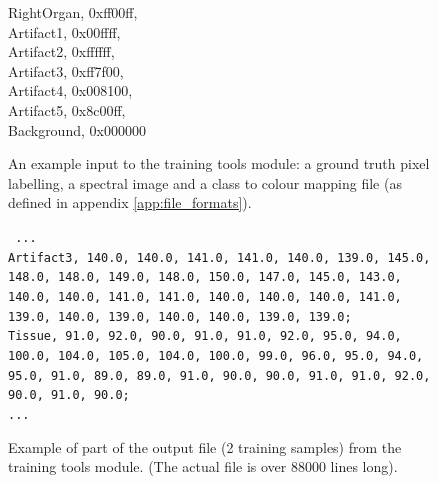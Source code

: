 \documentclass[12pt,twoside,notitlepage]{report}
\begin{document}
\begin{figure}
\begin{framed}
{                    RightOrgan, 0xff00ff,   \\
                    Artifact1, 0x00ffff,    \\
                    Artifact2, 0xffffff,    \\
                    Artifact3, 0xff7f00,    \\
                    Artifact4, 0x008100,    \\
                    Artifact5, 0x8c00ff,    \\
                    Background, 0x000000    \\
                } 
            \end{framed}
            \caption[An example input to the training tools module.]{An example input to the training tools module: a ground truth pixel labelling, a spectral image 
            and a class to colour mapping file (as defined in appendix \ref{app:file_formats}).}
        \end{figure}

        \begin{figure}
            \begin{framed}
                {\tt
                  ... \\
                  Artifact3, 140.0, 140.0, 141.0, 141.0, 140.0, 139.0, 145.0, 148.0, 148.0, 149.0, 148.0, 150.0, 147.0, 145.0, 143.0, 140.0, 140.0, 141.0, 141.0, 140.0, 140.0, 140.0, 141.0, 139.0, 140.0, 139.0, 140.0, 140.0, 139.0, 139.0; \\
                  Tissue, 91.0, 92.0, 90.0, 91.0, 91.0, 92.0, 95.0, 94.0, 100.0, 104.0, 105.0, 104.0, 100.0, 99.0, 96.0, 95.0, 94.0, 95.0, 91.0, 89.0, 89.0, 91.0, 90.0, 90.0, 91.0, 91.0, 92.0, 90.0, 91.0, 90.0; \\
                  ... 
                } 
            \end{framed}
            \caption[Example of part of the output file from the training tools module]{Example of part of the output file (2 training samples) from the training tools module. (The actual file is over 88000 lines long).}
        \end{figure}
\end{document}
